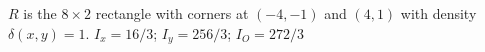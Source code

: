 {$R$ is the $8\times 2$ rectangle with corners at $(-4,-1)$ and $(4,1)$ with density $\delta(x,y) = 1$. 
}
{$I_x = 16/3$; $I_y = 256/3$; $I_O = 272/3$
}